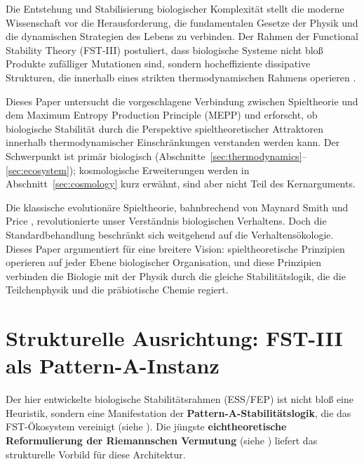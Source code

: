 \documentclass[12pt,a4paper]{article}
\theoremstyle{remark}
\begin{document}
Die Entstehung und Stabilisierung biologischer Komplexit\"at stellt die moderne Wissenschaft vor die Herausforderung, die fundamentalen Gesetze der Physik und die dynamischen Strategien des Lebens zu verbinden. Der Rahmen der Functional Stability Theory (FST-III) postuliert, dass biologische Systeme nicht blo\ss{} Produkte zuf\"alliger Mutationen sind, sondern hocheffiziente dissipative Strukturen, die innerhalb eines strikten thermodynamischen Rahmens operieren \citep{EcosystemMEPP}.

Dieses Paper untersucht die vorgeschlagene Verbindung zwischen Spieltheorie und dem Maximum Entropy Production Principle (MEPP) und erforscht, ob biologische Stabilit\"at durch die Perspektive spieltheoretischer Attraktoren innerhalb thermodynamischer Einschr\"ankungen verstanden werden kann. Der Schwerpunkt ist prim\"ar biologisch (Abschnitte~\ref{sec:thermodynamics}--\ref{sec:ecosystem}); kosmologische Erweiterungen werden in Abschnitt~\ref{sec:cosmology} kurz erw\"ahnt, sind aber nicht Teil des Kernarguments.

Die klassische evolution\"are Spieltheorie, bahnbrechend von Maynard Smith und Price \citep{MaynardSmith1982}, revolutionierte unser Verst\"andnis biologischen Verhaltens. Doch die Standardbehandlung beschr\"ankt sich weitgehend auf die Verhaltens\"okologie. Dieses Paper argumentiert f\"ur eine breitere Vision: spieltheoretische Prinzipien operieren auf jeder Ebene biologischer Organisation, und diese Prinzipien verbinden die Biologie mit der Physik durch die gleiche Stabilit\"atslogik, die die Teilchenphysik \citep{FSTI} und die pr\"abiotische Chemie \citep{FSTII} regiert.

\section{Strukturelle Ausrichtung: FST-III als Pattern-A-Instanz}
\label{sec:structural-alignment}

Der hier entwickelte biologische Stabilit\"atsrahmen (ESS/FEP) ist nicht blo\ss{} eine Heuristik, sondern eine Manifestation der \textbf{Pattern-A-Stabilit\"atslogik}, die das FST-\"Okosystem vereinigt (siehe \cite{FST-Unified2026}). Die j\"ungste \textbf{eichtheoretische Reformulierung der Riemannschen Vermutung} (siehe \cite{GeigerRH2026c}) liefert das strukturelle Vorbild f\"ur diese Architektur.
\end{document}
